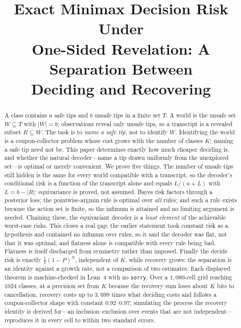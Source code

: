 \documentclass[conference]{IEEEtran}
\theoremstyle{definition}
\begin{document}
\title{Exact Minimax Decision Risk Under\\
One-Sided Revelation: A Separation Between\\
Deciding and Recovering}

\author{
}

\maketitle

\begin{abstract}
A class contains $a$ safe tips and $b$ unsafe tips in a finite set $T$. A world is the unsafe
set $W\subseteq T$ with $|W|=b$; observations reveal only unsafe tips, so a transcript is a
revealed subset $R\subseteq W$. The task is to \emph{name a safe tip}, not to identify $W$.
Identifying the world is a coupon-collector problem whose cost grows with the number of
classes $K$; naming a safe tip need not be. This paper determines exactly how much cheaper
deciding is, and whether the natural decoder---name a tip drawn uniformly from the unexplored
set---is optimal or merely convenient. We prove five things. The number of unsafe tips still
hidden is the same for every world compatible with a transcript, so the decoder's conditional
risk is a function of the transcript alone and equals $L/(a+L)$ with $L=b-|R|$: equivariance
is proved, not assumed. Bayes risk factors through a posterior loss; the pointwise-argmin rule
is optimal over \emph{all} rules; and such a rule exists because the action set is finite, so
the infimum is attained and no limiting argument is needed. Chaining these, the equivariant
decoder is a \emph{least element} of the achievable worst-case risks. This closes a real gap:
the earlier statement took constant risk as a hypothesis and contained no infimum over rules,
so it said the decoder was flat, not that it was optimal, and flatness alone is compatible
with every rule being bad. Flatness is itself discharged from symmetry rather than imposed.
Finally the decide risk is exactly $\tfrac12(1-P)^{N}$, independent of $K$, while recovery
grows: the separation is an identity against a growth rate, not a comparison of two
estimates. Each displayed theorem is machine-checked in Lean~4 with no \texttt{sorry}. Over a
$1{,}080$-cell grid reaching $1024$ classes, at a precision set from $K$ because the recovery
sum loses about $K$ bits to cancellation, recovery costs up to $3{,}699$ times what deciding
costs and follows a coupon-collector shape with constant $0.92$--$0.97$; simulating the process the
recovery identity is derived for---an inclusion--exclusion over events that are not
independent---reproduces it in every cell to within two standard errors.
\end{abstract}
\end{document}
